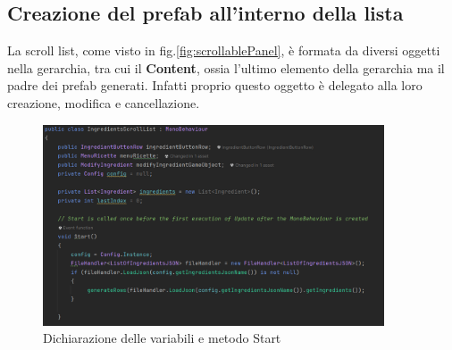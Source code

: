 \subsection{Creazione del prefab all'interno della lista}
La scroll list, come visto in fig.\ref{fig:scrollablePanel}, è formata da diversi oggetti nella gerarchia, tra cui il \textbf{Content}, ossia l'ultimo elemento della gerarchia ma il padre dei prefab generati. Infatti proprio questo oggetto è delegato alla loro creazione, modifica e cancellazione.
\begin{figure}[H]
    \centering
    \includegraphics[width=0.9\textwidth,height=\textheight,keepaspectratio]{figures/chapter_1/IngredientsScrollList_START.png}
    \caption{Dichiarazione delle variabili e metodo Start}
    \label{fig:ingredientsScrollListStart}
\end{figure}

